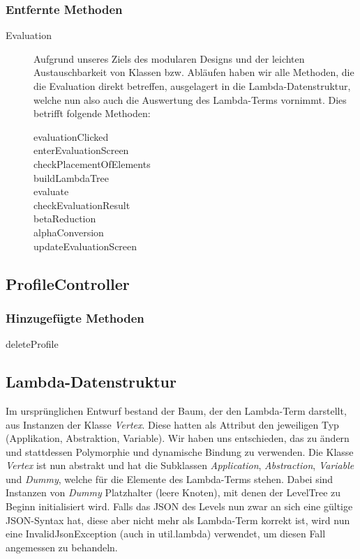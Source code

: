 \documentclass[parskip=full]{scrreprt}
\begin{document}
\subsubsection{Entfernte Methoden}
\begin{description}
	\item[Evaluation] Aufgrund unseres Ziels des modularen Designs und der leichten Austauschbarkeit von Klassen bzw. Abläufen haben wir alle Methoden, die die Evaluation direkt betreffen, ausgelagert in die Lambda-Datenstruktur, welche nun also auch die Auswertung des Lambda-Terms vornimmt. Dies betrifft folgende Methoden:
		\begin{description}
			\item[evaluationClicked]
			\item[enterEvaluationScreen]
			\item[checkPlacementOfElements]
			\item[buildLambdaTree]
			\item[evaluate]
			\item[checkEvaluationResult]
			\item[betaReduction]
			\item[alphaConversion]
			\item[updateEvaluationScreen]
		\end{description}
	
\end{description}


\subsection{ProfileController}

\subsubsection{Hinzugefügte Methoden}
\begin{description}
	\item[deleteProfile]
\end{description}

\subsection{Lambda-Datenstruktur}

Im ursprünglichen Entwurf bestand der Baum, der den Lambda-Term darstellt, aus Instanzen der Klasse \textit{Vertex}. Diese hatten als Attribut den jeweiligen Typ (Applikation, Abstraktion, Variable). Wir haben uns entschieden, das zu ändern und stattdessen Polymorphie und dynamische Bindung zu verwenden. Die Klasse \textit{Vertex} ist nun abstrakt und hat die Subklassen \textit{Application}, \textit{Abstraction}, \textit{Variable} und \textit{Dummy}, welche für die Elemente des Lambda-Terms stehen. Dabei sind Instanzen von \textit{Dummy} Platzhalter (leere Knoten), mit denen der LevelTree zu Beginn initialisiert wird.
Falls das JSON des Levels nun zwar an sich eine gültige JSON-Syntax hat, diese aber nicht mehr als Lambda-Term korrekt ist, wird nun eine InvalidJsonException (auch in util.lambda) verwendet, um diesen Fall angemessen zu behandeln.
\end{document}
